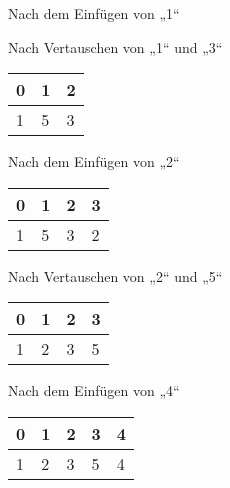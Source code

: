 \documentclass{lehramt-informatik-aufgabe}
\begin{document}
\begin{enumerate}
\begin{enumerate}
\begin{liDiagramm}{Nach dem Einfügen von „1“}
\end{liDiagramm}

\begin{liDiagramm}{Nach Vertauschen von „1“ und „3“}
\begin{tabular}{lll}
\bf{0} & \bf{1} & \bf{2} \\
\hline
1      & 5      & 3      \\
\end{tabular}

\end{liDiagramm}

\begin{liDiagramm}{Nach dem Einfügen von „2“}
\begin{tabular}{llll}
\bf{0} & \bf{1} & \bf{2} & \bf{3} \\
\hline
1      & 5      & 3      & 2      \\
\end{tabular}

\end{liDiagramm}

\begin{liDiagramm}{Nach Vertauschen von „2“ und „5“}
\begin{tabular}{llll}
\bf{0} & \bf{1} & \bf{2} & \bf{3} \\
\hline
1      & 2      & 3      & 5      \\
\end{tabular}

\end{liDiagramm}

\begin{liDiagramm}{Nach dem Einfügen von „4“}
\begin{tabular}{lllll}
\bf{0} & \bf{1} & \bf{2} & \bf{3} & \bf{4} \\
\hline
1      & 2      & 3      & 5      & 4      \\
\end{tabular}


\end{liDiagramm}
\end{enumerate}
\end{enumerate}
\end{document}

